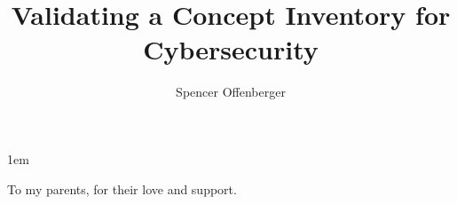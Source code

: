 \documentclass[draftthesis,tocnosub,noragright,centerchapter,12pt]{uiucecethesis09}
\title{Validating a Concept Inventory for Cybersecurity}
\author{Spencer Offenberger}
\begin{document}

%

%
\maketitle

\parindent 1em%

\frontmatter

%
\begin{abstract}

\end{abstract}



%
\begin{dedication}
To my parents, for their love and support.
\end{dedication}

%
\begin{acknowledgments}

\end{acknowledgments}

%

\tableofcontents

%
\listoftables

%
\listoffigures



\end{document}
